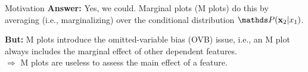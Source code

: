 \documentclass[11pt,compress,t,notes=noshow, xcolor=table]{beamer}
\begin{document}
\begin{vbframe}{Motivation}
\textbf{Answer:} Yes, we could. Marginal plots (M plots) do this by averaging (i.e., marginalizing) over the conditional distribution $\P(\xv_2|x_1)$.

\lz

\textbf{But:} M plots introduce the omitted-variable bias (OVB) issue, i.e., an
M plot always includes the marginal effect of other dependent features.\\
$\Rightarrow$ M plots are useless to assess the main effect of a feature.

\end{vbframe}
\end{document}
